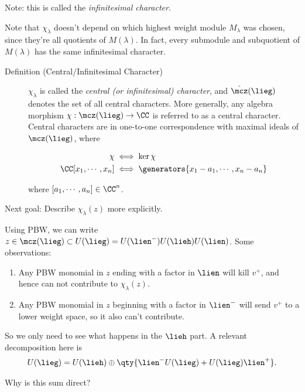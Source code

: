 Note: this is called the \emph{infinitesimal character}.

Note that \(\chi_\lambda\) doesn't depend on which highest weight module
\(M_\lambda\) was chosen, since they're all quotients of \(M(\lambda)\).
In fact, every submodule and subquotient of \(M(\lambda)\) has the same
infinitesimal character.

\begin{description}
\item[Definition (Central/Infinitesimal Character)]
\(\chi_\lambda\) is called the \emph{central (or infinitesimal)
character}, and \(\hat\mcz(\lieg)\) denotes the set of all central
characters. More generally, any algebra morphism
\(\chi: \mcz(\lieg) \to \CC\) is referred to as a central character.
Central characters are in one-to-one correspondence with maximal ideals
of \(\mcz(\lieg)\), where

\begin{align*}
\chi & \iff \ker \chi \\
\CC[x_1, \cdots, x_n] &\iff \generators{x_1 - a_1, \cdots, x_n - a_n}
\end{align*}

where \([a_1, \cdots, a_n] \in \CC^n\).
\end{description}

Next goal: Describe \(\chi_\lambda(z)\) more explicitly.

Using PBW, we can write
\(z\in \mcz(\lieg) \subset U(\lieg) = U(\lien^-) U(\lieh) U(\lien)\).
Some observations:

\begin{enumerate}
\def\labelenumi{\arabic{enumi}.}
\tightlist
\item
  Any PBW monomial in \(z\) ending with a factor in \(\lien\) will kill
  \(v^+\), and hence can not contribute to \(\chi_\lambda(z)\).
\item
  Any PBW monomial in \(z\) beginning with a factor in \(\lien^-\) will
  send \(v^+\) to a lower weight space, so it also can't contribute.
\end{enumerate}

So we only need to see what happens in the \(\lieh\) part. A relevant
decomposition here is
\begin{align*}
U(\lieg) = U(\lieh) \oplus \qty{ \lien^- U(\lieg) + U(\lieg)\lien^+  }
.\end{align*}

\begin{description}
\tightlist
\item[Exercise]
Why is this sum direct?
\end{description}

